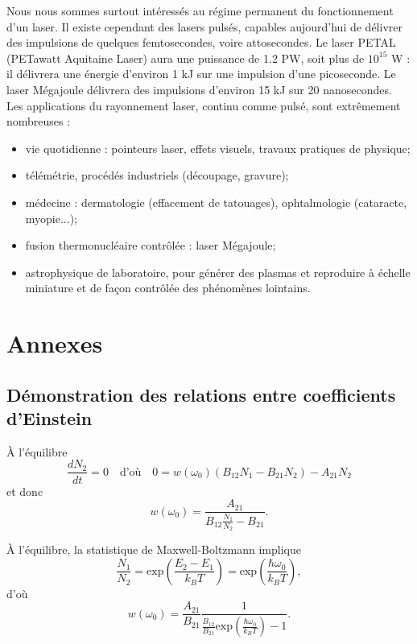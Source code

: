 \documentclass[11pt,a4paper]{report}
\begin{document}
Nous nous sommes surtout intéressés au régime permanent du fonctionnement d'un laser. Il existe cependant des lasers pulsés, capables aujourd'hui de délivrer des impulsions de quelques femtosecondes, voire attosecondes. Le laser PETAL (PETawatt Aquitaine Laser) aura une puissance de 1.2 PW, soit plus de $10^{15}$ W : il délivrera une énergie d'environ 1 kJ sur une impulsion d'une picoseconde. Le laser Mégajoule délivrera des impulsions d'environ 15 kJ sur 20 nanosecondes.\\

Les applications du rayonnement laser, continu comme pulsé, sont extrêmement nombreuses : 
\begin{itemize}
	\item vie quotidienne : pointeurs laser, effets visuels, travaux pratiques de physique;
	\item télémétrie, procédés industriels (découpage, gravure);
	\item médecine : dermatologie (effacement de tatouages), ophtalmologie (cataracte, myopie...);
	\item fusion thermonucléaire contrôlée : laser Mégajoule;
	\item astrophysique de laboratoire, pour générer des plasmas et reproduire à échelle miniature et 			de façon contrôlée des phénomènes lointains.
\end{itemize}



\newpage
\section*{Annexes}

\subsection*{Démonstration des relations entre coefficients d'Einstein}

\`A l'équilibre
\begin{equation}
	\frac{dN_2}{dt} = 0 \quad\text{d'où}\quad	
	0 = w(\omega_0)\left(B_{12} N_1 - B_{21}N_2\right) - A_{21}N_2
\end{equation}
et donc
\begin{equation}
	w(\omega_0) = \frac{\displaystyle{A_{21}}}{\displaystyle{B_{12}\frac{N_1}{N_2}-B_{21}}}.
\end{equation}

\`A l'équilibre, la statistique de Maxwell-Boltzmann implique
\begin{equation}
	\frac{N_1}{N_2} = \text{exp}\left(\frac{E_2-E_1}{k_B T}\right) 
	= \text{exp}\left(\frac{\hbar \omega_0}{k_B T}\right),
\end{equation}
d'où
\begin{equation}
	w(\omega_0) = \frac{A_{21}}{B_{21}}\frac{1}{\displaystyle{\frac{B_{12}}{B_{21}} \text{exp}\left(\frac{\hbar \omega_0}{k_B T}\right)-1}}.
\end{equation}
\end{document}
